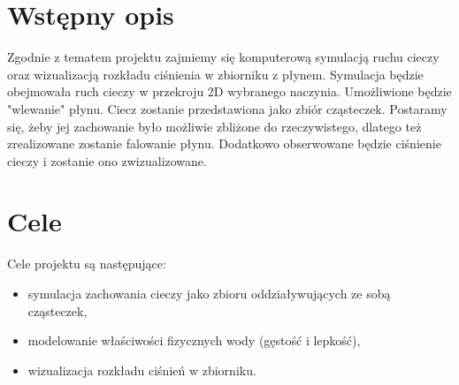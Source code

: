 \documentclass[a4paper]{article}
\begin{document}

\section{Wstępny opis}
Zgodnie z tematem projektu zajmiemy się komputerową symulacją ruchu cieczy oraz wizualizacją rozkładu ciśnienia w zbiorniku z płynem.
Symulacja będzie obejmowała ruch cieczy w przekroju 2D wybranego naczynia.  Umożliwione będzie "wlewanie" płynu. Ciecz zostanie przedstawiona jako zbiór cząsteczek. Postaramy się, żeby jej zachowanie było możliwie zbliżone do rzeczywistego, dlatego też zrealizowane zostanie falowanie płynu.
Dodatkowo obserwowane będzie ciśnienie cieczy i zostanie ono zwizualizowane.

\section{Cele}
Cele projektu są następujące:
\begin{itemize}
  \item symulacja zachowania cieczy jako zbioru oddziaływujących ze sobą cząsteczek,
  \item modelowanie właściwości fizycznych wody (gęstość i lepkość),
  \item wizualizacja rozkładu ciśnień w zbiorniku.
\end{itemize}
\end{document}
